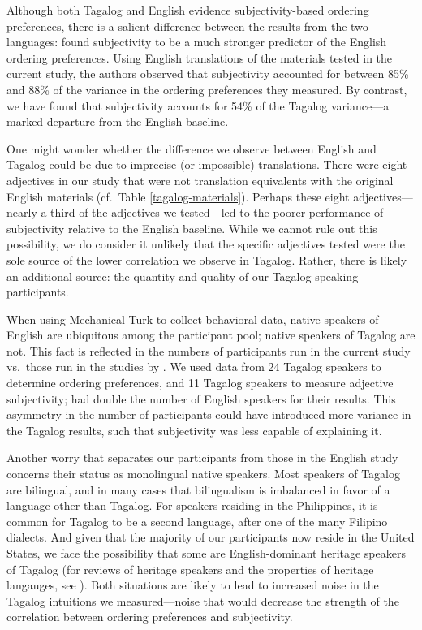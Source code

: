 \documentclass[12pt,letterpaper]{article}
\begin{document}
Although both Tagalog and English evidence subjectivity-based ordering preferences, there is a salient difference between the results from the two languages: \cite{scontrasetal2017adjectives} found subjectivity to be a much stronger predictor of the English ordering preferences. Using English translations of the materials tested in the current study, the authors observed that subjectivity accounted for between 85\% and 88\% of the variance in the ordering preferences they measured. By contrast, we have found that subjectivity accounts for 54\% of the Tagalog variance---a marked departure from the English baseline.

One might wonder whether the difference we observe between English and Tagalog could be due to imprecise (or impossible) translations. There were eight adjectives in our study that were not translation equivalents with the original English materials (cf.~Table \ref{tagalog-materials}). Perhaps these eight adjectives---nearly a third of the adjectives we tested---led to the poorer performance of subjectivity relative to the English baseline. While we cannot rule out this possibility, we do consider it unlikely that the specific adjectives tested were the sole source of the lower correlation we observe in Tagalog. Rather, there is likely an additional source: the quantity and quality of our Tagalog-speaking participants.

When using Mechanical Turk to collect behavioral data, native speakers of English are ubiquitous among the participant pool; native speakers of Tagalog are not. This fact is reflected in the numbers of participants run in the current study vs.~those run in the studies by \cite{scontrasetal2017adjectives}. We used data from 24 Tagalog speakers to determine ordering preferences, and 11 Tagalog speakers to measure adjective subjectivity; \citeauthor{scontrasetal2017adjectives} had double the number of English speakers for their results. This asymmetry in the number of participants could have introduced more variance in the Tagalog results, such that subjectivity was less capable of explaining it.

Another worry that separates our participants from those in the English study concerns their status as monolingual native speakers. Most speakers of Tagalog are bilingual, and in many cases that bilingualism is imbalanced in favor of a language other than Tagalog. For speakers residing in the Philippines, it is common for Tagalog to be a second language, after one of the many Filipino dialects. And given that the majority of our participants now reside in the United States, we face the possibility that some are English-dominant heritage speakers of Tagalog (for reviews of heritage speakers and the properties of heritage langauges, see \citealp{benmamounetal2013,scontrasetal2015frontiers,montrul2016,polinsky2018book}). Both situations are likely to lead to increased noise in the Tagalog intuitions we measured---noise that would decrease the strength of the correlation between ordering preferences and subjectivity.
\end{document}

